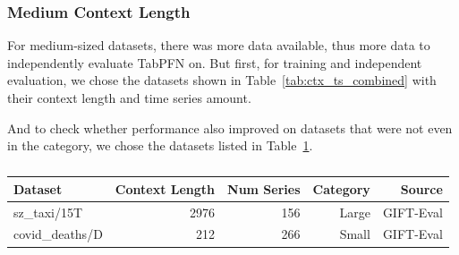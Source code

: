 \subsubsection{Medium Context Length}
For medium-sized datasets, there was more data available, thus more data to independently evaluate TabPFN on.
But first, for training and independent evaluation, we chose the datasets shown in Table~\ref{tab:ctx_ts_combined} with their context length and time series amount.
\begin{table}[H]
\centering
{}
\caption{}
\label{tab:ctx_ts_combined}
\end{table}
And to check whether performance also improved on datasets that were not even in the category, we chose the datasets listed in Table~\ref{tab:ctx_ts_3}.
\begin{table}[H]
\centering
\begin{tabular}{lrrrr}
\hline
Dataset & Context Length & Num Series & Category & Source \\
\hline
sz\_taxi/15T & 2976 & 156 & Large & GIFT-Eval \\
covid\_deaths/D & 212 & 266 & Small & GIFT-Eval \\
\hline
\end{tabular}
\caption{}
\label{tab:ctx_ts_3}
\end{table}
